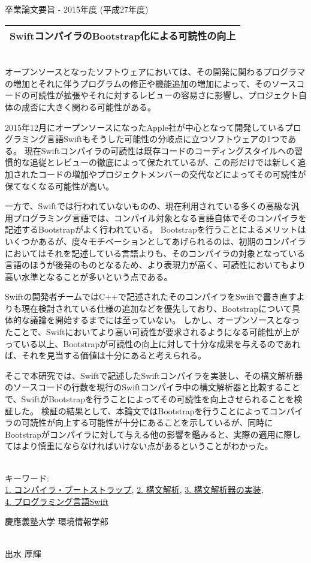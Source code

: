 卒業論文要旨 - 2015年度 (平成27年度)
~ \\
\begin{center}
\begin{Large}
\begin{tabular}{|c|} \hline
SwiftコンパイラのBootstrap化による可読性の向上
\\ \hline
\end{tabular}
\end{Large}
\end{center}
~  \\

オープンソースとなったソフトウェアにおいては、その開発に関わるプログラマの増加とそれに伴うプログラムの修正や機能追加の増加によって、そのソースコードの可読性が拡張やそれに対するレビューの容易さに影響し、プロジェクト自体の成否に大きく関わる可能性がある。

2015年12月にオープンソースになったApple社が中心となって開発しているプログラミング言語Swiftもそうした可能性の分岐点に立つソフトウェアの1つである。
現在Swiftコンパイラの可読性は既存コードのコーディングスタイルへの習慣的な追従とレビューの徹底によって保たれているが、この形だけでは新しく追加されたコードの増加やプロジェクトメンバーの交代などによってその可読性が保てなくなる可能性が高い。

一方で、Swiftでは行われていないものの、現在利用されている多くの高級な汎用プログラミング言語では、コンパイル対象となる言語自体でそのコンパイラを記述するBootstrapがよく行われている。
Bootstrapを行うことによるメリットはいくつかあるが、度々モチベーションとしてあげられるのは、初期のコンパイラにおいてはそれを記述している言語よりも、そのコンパイラの対象となっている言語のほうが後発のものとなるため、より表現力が高く、可読性においてもより高い水準となることが多いという点である。

Swiftの開発者チームではC++で記述されたそのコンパイラをSwiftで書き直すよりも現在検討されている仕様の追加などを優先しており、Bootstrapについて具体的な議論を開始するまでには至っていない。
しかし、オープンソースとなったことで、Swiftにおいてより高い可読性が要求されるようになる可能性が上がっている以上、Bootstrapが可読性の向上に対して十分な成果を与えるのであれば、それを見当する価値は十分にあると考えられる。

そこで本研究では、Swiftで記述したSwiftコンパイラを実装し、その構文解析器のソースコードの行数を現行のSwiftコンパイラ中の構文解析器と比較することで、SwiftがBootstrapを行うことによってその可読性を向上させられることを検証した。
検証の結果として、本論文ではBootstrapを行うことによってコンパイラの可読性が向上する可能性が十分にあることを示しているが、同時にBootstrapがコンパイラに対して与える他の影響を鑑みると、実際の適用に際してはより慎重にならなければいけない点があるということがわかった。

~ \\
キーワード:\\
\underline{1. コンパイラ・ブートストラップ},
\underline{2. 構文解析},
\underline{3. 構文解析器の実装},\\
\underline{4. プログラミング言語Swift}
\begin{flushright}
慶應義塾大学 環境情報学部\\
~ \\
\begin{Large}
出水 厚輝
\end{Large}
\end{flushright}
